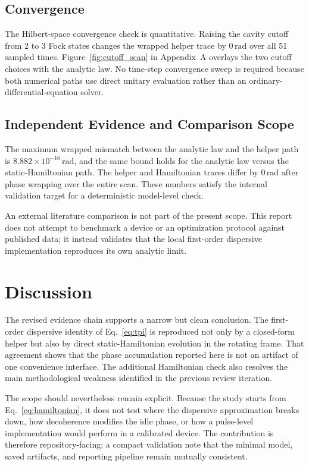 \documentclass[aps,pra,twocolumn,reprint,amsmath,amssymb]{revtex4-2}
\begin{document}
\subsection{Convergence}
The Hilbert-space convergence check is quantitative. Raising the cavity cutoff from 2 to 3 Fock states changes the wrapped helper trace by $0\,\mathrm{rad}$ over all 51 sampled times. Figure~\ref{fig:cutoff_scan} in Appendix~A overlays the two cutoff choices with the analytic law. No time-step convergence sweep is required because both numerical paths use direct unitary evaluation rather than an ordinary-differential-equation solver.

\subsection{Independent Evidence and Comparison Scope}
The maximum wrapped mismatch between the analytic law and the helper path is $8.882\times10^{-16}\,\mathrm{rad}$, and the same bound holds for the analytic law versus the static-Hamiltonian path. The helper and Hamiltonian traces differ by $0\,\mathrm{rad}$ after phase wrapping over the entire scan. These numbers satisfy the internal validation target for a deterministic model-level check.

An external literature comparison is not part of the present scope. This report does not attempt to benchmark a device or an optimization protocol against published data; it instead validates that the local first-order dispersive implementation reproduces its own analytic limit.

\section{Discussion}
The revised evidence chain supports a narrow but clean conclusion. The first-order dispersive identity of Eq.~\eqref{eq:tpi} is reproduced not only by a closed-form helper but also by direct static-Hamiltonian evolution in the rotating frame. That agreement shows that the phase accumulation reported here is not an artifact of one convenience interface. The additional Hamiltonian check also resolves the main methodological weakness identified in the previous review iteration.

The scope should nevertheless remain explicit. Because the study starts from Eq.~\eqref{eq:hamiltonian}, it does not test where the dispersive approximation breaks down, how decoherence modifies the idle phase, or how a pulse-level implementation would perform in a calibrated device. The contribution is therefore repository-facing: a compact validation note that the minimal model, saved artifacts, and reporting pipeline remain mutually consistent.
\end{document}
